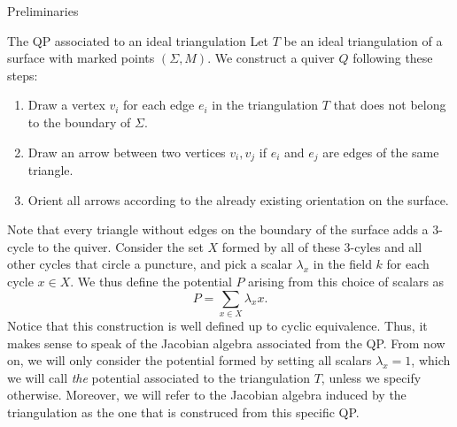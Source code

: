 \begin{chapter}{Preliminaries}
\begin{section}{The QP associated to an ideal triangulation}
Let $T$ be an ideal triangulation of a surface with marked points $(\Sigma, M)$. We construct a quiver $Q$ following these steps:
\begin{enumerate}
\item Draw a vertex $v_i$ for each edge $e_i$ in the triangulation $T$ that does not belong to the boundary of $\Sigma$.
\item Draw an arrow between two vertices $v_i, v_j$ if $e_i$ and $e_j$ are edges of the same triangle.
\item Orient all arrows according to the already existing orientation on the surface.
\end{enumerate}

Note that every triangle without edges on the boundary of the surface adds a 3-cycle to the quiver. Consider the set $X$ formed by all of these 3-cyles and all other cycles that circle a puncture, and pick a scalar $\lambda_x$ in the field $k$ for each cycle $x\in X$. We thus define the potential $P$ arising from this choice of scalars as
\[P=\sum_{x\in X} \lambda_x x.\]
Notice that this construction is well defined up to cyclic equivalence. Thus, it makes sense to speak of the Jacobian algebra associated from the QP. From now on, we will only consider the potential formed by setting all scalars $\lambda_x=1$, which we will call \emph{the} potential associated to the triangulation $T$, unless we specify otherwise. Moreover, we will refer to the Jacobian algebra induced by the triangulation as the one that is construced from this specific QP.


\end{section}
\end{chapter}
